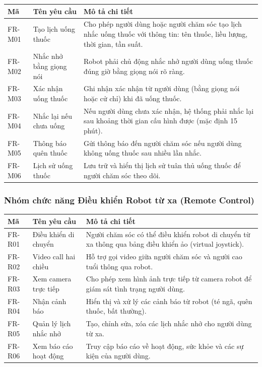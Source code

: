 \begin{table}[h!]
\centering
\label{tab:req-med}
\begin{tabular}{|L{1.5cm}|L{3.5cm}|L{8.5cm}|}
\hline
\textbf{Mã} & \textbf{Tên yêu cầu} & \textbf{Mô tả chi tiết} \\
\hline
FR-M01 & Tạo lịch uống thuốc & Cho phép người dùng hoặc người chăm sóc tạo lịch nhắc uống thuốc với thông tin: tên thuốc, liều lượng, thời gian, tần suất. \\
\hline
FR-M02 & Nhắc nhở bằng giọng nói & Robot phải chủ động nhắc nhở người dùng uống thuốc đúng giờ bằng giọng nói rõ ràng. \\
\hline
FR-M03 & Xác nhận uống thuốc & Ghi nhận xác nhận từ người dùng (bằng giọng nói hoặc cử chỉ) khi đã uống thuốc. \\
\hline
FR-M04 & Nhắc lại nếu chưa uống & Nếu người dùng chưa xác nhận, hệ thống phải nhắc lại sau khoảng thời gian cấu hình được (mặc định 15 phút). \\
\hline
FR-M05 & Thông báo quên thuốc & Gửi thông báo đến người chăm sóc nếu người dùng không uống thuốc sau nhiều lần nhắc. \\
\hline
FR-M06 & Lịch sử uống thuốc & Lưu trữ và hiển thị lịch sử tuân thủ uống thuốc để người chăm sóc theo dõi. \\
\hline
\end{tabular}
\end{table}


\subsubsection{Nhóm chức năng Điều khiển Robot từ xa (Remote Control)}

\begin{table}[h!]
\centering
\label{tab:req-remote}
\begin{tabular}{|L{1.5cm}|L{3.5cm}|L{8.5cm}|}
\hline
\textbf{Mã} & \textbf{Tên yêu cầu} & \textbf{Mô tả chi tiết} \\
\hline
FR-R01 & Điều khiển di chuyển & Người chăm sóc có thể điều khiển robot di chuyển từ xa thông qua bảng điều khiển ảo (virtual joystick). \\
\hline
FR-R02 & Video call hai chiều & Hỗ trợ gọi video giữa người chăm sóc và người cao tuổi thông qua robot. \\
\hline
FR-R03 & Xem camera trực tiếp & Cho phép xem hình ảnh trực tiếp từ camera robot để giám sát tình trạng người dùng. \\
\hline
FR-R04 & Nhận cảnh báo & Hiển thị và xử lý các cảnh báo từ robot (té ngã, quên thuốc, bất thường). \\
\hline
FR-R05 & Quản lý lịch nhắc nhở & Tạo, chỉnh sửa, xóa các lịch nhắc nhở cho người dùng từ xa. \\
\hline
FR-R06 & Xem báo cáo hoạt động & Truy cập báo cáo về hoạt động, sức khỏe và các sự kiện của người dùng. \\
\hline
\end{tabular}
\end{table}


